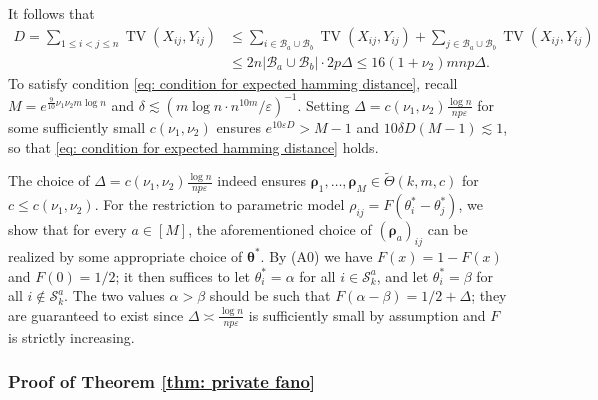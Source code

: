 \documentclass[letterpaper,12pt]{article}
\numberwithin{equation}{section}
\theoremstyle{plain}
\numberwithin{Theorem}{section}
\numberwithin{corollary}{section}
\numberwithin{proposition}{section}
\numberwithin{Lemma}{section}
{
	\theoremstyle{definition}
	\newtheorem{Definition}{Definition}
	\newtheorem{example}{Example}
	\numberwithin{example}{section}
	\newtheorem{fact}{Fact}
	\numberwithin{fact}{section}
	\newtheorem{remark}{Remark}
}
\newcommand{\1}{\mathbbm{1}}
\def\bth{{\boldsymbol{\theta}}}
\begin{document}
It follows that
\begin{align*}
	D = \sum_{1 \leq i < j \leq n} \operatorname{TV}(X_{ij}, Y_{ij}) &\leq \sum_{i \in \mathcal B_a \cup \mathcal B_b} \operatorname{TV}(X_{ij}, Y_{ij}) + \sum_{j \in \mathcal B_a \cup \mathcal B_b} \operatorname{TV}(X_{ij}, Y_{ij}) \\
	&\leq 2n|\mathcal B_a \cup \mathcal B_b| \cdot 2p\Delta \leq 16(1+\nu_2)mnp\Delta.
\end{align*}
To satisfy condition \eqref{eq: condition for expected hamming distance}, recall $M = e^{\frac{9}{10}\nu_1\nu_2 m \log n}$ and $\delta \lesssim \left(m\log n \cdot n^{10m}/\varepsilon\right)^{-1}$. Setting $\Delta = c(\nu_1, \nu_2)\frac{\log n}{np\varepsilon}$ for some sufficiently small $c(\nu_1, \nu_2)$ ensures $e^{10\varepsilon D} > M - 1$ and $10\delta D(M-1) \lesssim 1$, so that \eqref{eq: condition for expected hamming distance} holds.

The choice of $\Delta = c(\nu_1, \nu_2)\frac{\log n}{np\varepsilon}$ indeed ensures 
$\bm \rho_1, \ldots, \bm \rho_M \in \widetilde \Theta(k, m, c)$ for $c \leq c(\nu_1, \nu_2)$. For the restriction to parametric model $\rho_{ij} = F(\theta^*_i - \theta^*_j)$, we show that for every $a \in [M]$, the aforementioned choice of $\left(\bm \rho_a\right)_{ij}$ can be realized by some appropriate choice of $\bth^*$. By (A0) we have $F(x) = 1-F(x)$ and $F(0) = 1/2$; it then suffices to let $\theta^*_i = \alpha$ for all $i \in \mathcal S^a_k$, and let $\theta^*_i = \beta$ for all $i \not \in \mathcal S^a_k$. The two values $\alpha > \beta$ should be such that $F(\alpha - \beta) = 1/2 + \Delta$; they are guaranteed to exist since $\Delta \asymp \frac{\log n}{np\varepsilon}$ is sufficiently small by assumption and $F$ is strictly increasing.



\subsubsection{Proof of Theorem \ref{thm: private fano}}\label{sec: proof of thm: private fano}
\end{document}
